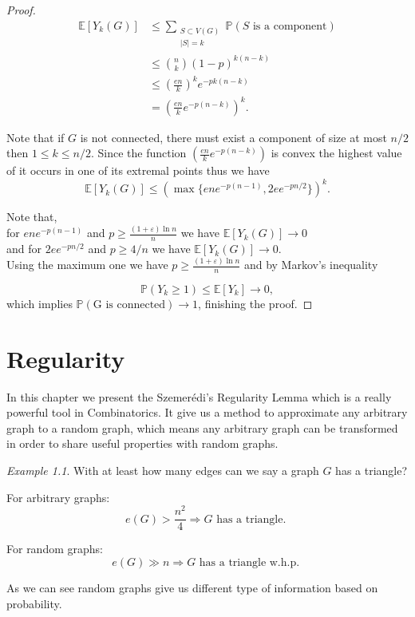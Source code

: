 \documentclass[12pt,twoside,a4paper,bibliography=totocnumbered]{book}
\numberwithin{equation}{section}
\let\log=\ln
\theoremstyle{remark}
\newtheorem{example}	[theorem] {Example}
\begin{document}
\begin{proof}
\begin{align*}
\mathbb{E}[Y_k (G)]  & \leq \sum_{\substack{S\subset V(G) \\ |S| = k}} \mathbb{P}(S\text{ is a component})\\
&\leq \binom{n}{k}(1-p)^{k(n-k)}\\
&\leq \left( \frac{en}{k} \right) ^k e^{-pk(n-k)}\\
& = \left( \frac{en}{k} e^{-p(n-k)} \right)^k.
\end{align*}

Note that if $G$ is not connected, there must exist a component of size at most $ n/2$ then $1 \leq k \leq n/2$. Since the function $\left( \frac{en}{k} e^{-p(n-k)} \right)$ is convex the highest value of it occurs in one of its extremal points thus we have
$$\mathbb{E}[Y_k (G)] \leq (\max\{ene^{-p(n-1)}, 2ee^{-pn/2}\})^k .$$

Note that, \\
for $ene^{-p(n-1)}$ and $p \geq \frac{(1 + \varepsilon) \log n}{n}$ we have $\mathbb{E}[Y_k (G)] \rightarrow 0$\\
and for $2ee^{-pn/2}$ and $p \geq 4/n$ we have $\mathbb{E}[Y_k (G)] \rightarrow 0$.\\

Using the maximum one we have $p \geq \frac{(1 + \varepsilon) \log n}{n}$  and by Markov's inequality

 $$\mathbb{P}(Y_k \geq 1) \leq \mathbb{E}[Y_k] \rightarrow 0,$$
 which implies $\mathbb{P}(\text{G is connected}) \rightarrow 1$, finishing the proof.

\end{proof}
\chapter{Regularity}
In this chapter we present the Szemerédi's Regularity Lemma which is a really powerful tool in Combinatorics. It give us a method to approximate any arbitrary graph to a random graph, which means any arbitrary graph can be transformed in order to share useful properties with random graphs.

\begin{example}
With at least how many edges can we say a graph $G$ has a triangle?

For arbitrary graphs:
$$ e(G) > \frac{n^2}{4} \Rightarrow G \text{ has a triangle. }$$

For random graphs:
$$ e(G) \gg n \Rightarrow G\text{ has a triangle w.h.p. } $$

As we can see random graphs give us different type of information based on probability.

\end{example}
\end{document}
